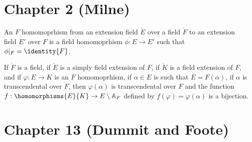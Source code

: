 \section{Chapter 2 (Milne)}
    \begin{definition}
        An $F$ homomoprhism from an extension field $\ring{E}$ over a field
        $\ring{F}$ to an extension field $\ring{E'}$  over $F$ is a field
        homomoprhism $\phi:E\rightarrow{E}'$ such that
        $\phi|_{F}=\identity{F}$.
    \end{definition}
    \begin{theorem}
        If $\ring{F}$ is a field, if $\ring{E}$ is a simply field extension
        of $F$, if $\ring{K}$ is a field extension of $F$, and if
        $\varphi:E\rightarrow{K}$ is an $F$ homomoprhism, if $\alpha\in{E}$
        is such that $E=F(\alpha)$, if $\alpha$ is transcendental over $F$,
        then $\varphi(\alpha)$ is transcendental over $F$ and the function
        $f:\homomorphisms{E}{K}\rightarrow{E}\setminus\mathbb{A}_{F}$
        defined by $f(\varphi)=\varphi(\alpha)$ is a bijection.
    \end{theorem}
\section{Chapter 13 (Dummit and Foote)}
\endgroup